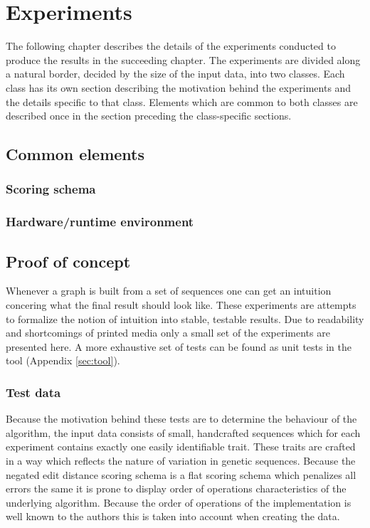 \documentclass[thesis.tex]{subfiles}
\begin{document}
\chapter{Experiments}
The following chapter describes the details of the experiments conducted to produce the results in the succeeding chapter. The experiments are divided along a natural border, decided by the size of the input data, into two classes. Each class has its own section describing the motivation behind the experiments and the details specific to that class. Elements which are common to both classes are described once in the section preceding the class-specific sections.
\section{Common elements}
\subsection{Scoring schema}
\subsection{Hardware/runtime environment}
\section{Proof of concept}
Whenever a graph is built from a set of sequences one can get an intuition concering what the final result should look like. These experiments are attempts to formalize the notion of intuition into stable, testable results. Due to readability and shortcomings of printed media only a small set of the experiments are presented here. A more exhaustive set of tests can be found as unit tests in the tool (Appendix \ref{sec:tool}).
\subsection{Test data}
Because the motivation behind these tests are to determine the behaviour of the algorithm, the input data consists of small, handcrafted sequences which for each experiment contains exactly one easily identifiable trait. These traits are crafted in a way which reflects the nature of variation in genetic sequences. Because the negated edit distance scoring schema is a flat scoring schema which penalizes all errors the same it is prone to display order of operations characteristics of the underlying algorithm. Because the order of operations of the implementation is well known to the authors this is taken into account when creating the data.
\end{document}

